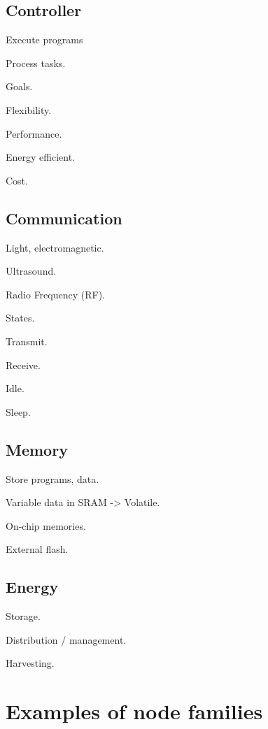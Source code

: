 \subsection{Controller}

\begin{description}
\item Execute programs
\item Process tasks.
\end{description}

Goals.

\begin{description}
\item Flexibility.
\item Performance.
\item Energy efficient.
\item Cost.
\end{description}

\subsection{Communication}
\begin{description}
\item Light, electromagnetic.
\item Ultrasound.
\item Radio Frequency (RF).
\end{description}

States.
\begin{description}
\item Transmit.
\item Receive.
\item Idle.
\item Sleep.
\end{description}

\subsection{Memory}

\begin{description}
\item Store programs, data.
\item Variable data in SRAM -> Volatile.
\item On-chip memories.
\item External flash.
\end{description}

\subsection{Energy}
\begin{description}
\item Storage.
\item Distribution / management.
\item Harvesting.
\end{description}
\section{Examples of node families}



